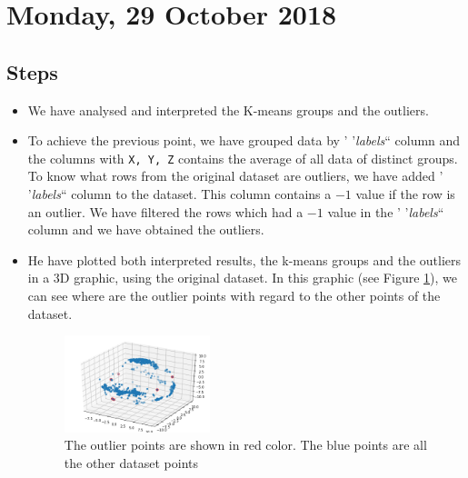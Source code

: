 \section{Monday, 29 October 2018}

\subsection{Steps}
\begin{itemize}
\item We have analysed and interpreted the K-means groups and the outliers.
\item To achieve the previous point, we have grouped data by  ' '\textit{labels}`` column and the columns with \texttt{X, Y, Z} contains the average of all data of distinct groups.  \\
To know what rows from the original dataset are outliers, we have added ' '\textit{labels}`` column to the dataset. This column contains a $-1$ value if the row is an outlier. We have filtered the rows which had a $-1$ value in the ' '\textit{labels}`` column and we have obtained the outliers.
\item He have plotted both interpreted results, the k-means groups and the outliers in a 3D graphic, using the original dataset. In this graphic (see Figure \ref{fig:outliers}), we can see where are the outlier points with regard to the other points of the dataset. 

\begin{figure}[!htb]
\centering
\includegraphics[width=0.4\textwidth]{../../reports/figures/outliers3D_AccelerometerStat.png}
\caption{The outlier points are shown in red color. The blue points are all the other dataset points}
\label{fig:outliers}
\end{figure}

\end{itemize}